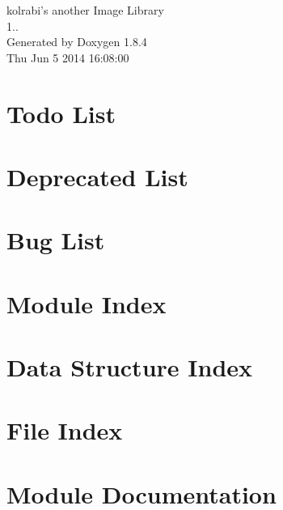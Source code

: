 \documentclass[twoside]{book}
\newcommand{\clearemptydoublepage}{%
  \newpage{\pagestyle{empty}\cleardoublepage}%
}
\begin{document}
\hypersetup{pageanchor=false}
\begin{titlepage}
\vspace*{7cm}
\begin{center}%
{\Large kolrabi's another Image Library \\[1ex]\large 1.. }\\
\vspace*{1cm}
{\large Generated by Doxygen 1.8.4}\\
\vspace*{0.5cm}
{\small Thu Jun 5 2014 16:08:00}\\
\end{center}
\end{titlepage}
\clearemptydoublepage
\tableofcontents
\clearemptydoublepage
{}
\hypersetup{pageanchor=true}

\chapter{Todo List}
\label{todo}
\hypertarget{todo}{}

\chapter{Deprecated List}
\label{deprecated}
\hypertarget{deprecated}{}

\chapter{Bug List}
\label{bug}
\hypertarget{bug}{}

\chapter{Module Index}

\chapter{Data Structure Index}

\chapter{File Index}

\chapter{Module Documentation}















\end{document}
